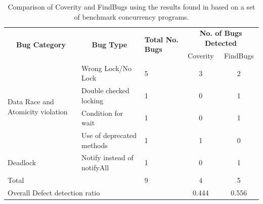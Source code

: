 \documentclass[10pt,oneside]{IEEEtran}
\begin{document}
\begin{table}[ht]
\centering
\caption{Comparison of Coverity and FindBugs using the results found in \cite{11} based on a set of benchmark concurrency programs.}
\label{tbl:concurrencyBugCompare}
\begin{tabular}{@{}lllcc@{}}
\toprule
\multicolumn{1}{c}{\multirow{2}{*}{{\bf Bug Category}}}                 & \multicolumn{1}{c}{\multirow{2}{*}{{\bf Bug Type}}} & \multirow{2}{*}{{\bf Total No. Bugs}} & \multicolumn{2}{c}{{\bf No. of Bugs Detected}} \\ \cmidrule(l){4-5}
\multicolumn{1}{c}{}                                                    & \multicolumn{1}{c}{}                                &                                       & \multicolumn{1}{c|}{Coverity}    & FindBugs    \\ \midrule
\multicolumn{1}{l|}{\multirow{4}{*}{Data Race and Atomicity violation}} & \multicolumn{1}{l|}{Wrong Lock/No Lock}             & \multicolumn{1}{l|}{5}                & \multicolumn{1}{c|}{3}           & 2           \\ \cmidrule(l){2-5}
\multicolumn{1}{l|}{}                                                   & \multicolumn{1}{l|}{Double checked locking}         & \multicolumn{1}{l|}{1}                & \multicolumn{1}{c|}{0}           & 1           \\ \cmidrule(l){2-5}
\multicolumn{1}{l|}{}                                                   & \multicolumn{1}{l|}{Condition for wait}             & \multicolumn{1}{l|}{1}                & \multicolumn{1}{c|}{0}           & 1           \\ \cmidrule(l){2-5}
\multicolumn{1}{l|}{}                                                   & \multicolumn{1}{l|}{Use of deprecated methods}      & \multicolumn{1}{l|}{1}                & \multicolumn{1}{c|}{1}           & 0           \\ \midrule
\multicolumn{1}{l|}{Deadlock}                                           & \multicolumn{1}{l|}{Notify instead of notifyAll}    & \multicolumn{1}{l|}{1}                & \multicolumn{1}{c|}{0}           & 1           \\ \midrule
\multicolumn{2}{l|}{Total}                                                                                                    & \multicolumn{1}{l|}{9}                & \multicolumn{1}{c|}{4}           & 5           \\
\multicolumn{3}{l}{Overall Defect detection ratio}                                                                                                                    & 0.444                            & 0.556       \\ \bottomrule
\end{tabular}
\end{table}
\end{document}
